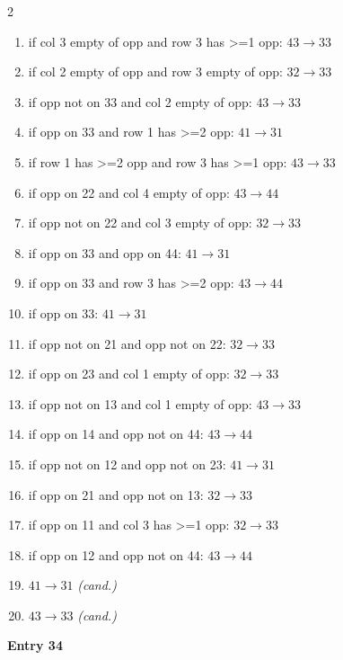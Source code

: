 \begin{multicols}{2}
\begin{tikzpicture}[scale=0.24]
\end{tikzpicture}
\nopagebreak\begin{enumerate}[topsep=1pt,itemsep=0pt,parsep=0pt,leftmargin=2.2em,label=\arabic*.]
\item if col 3 empty of opp and row 3 has >=1 opp: $43\!\to\!33$
\item if col 2 empty of opp and row 3 empty of opp: $32\!\to\!33$
\item if opp not on 33 and col 2 empty of opp: $43\!\to\!33$
\item if opp on 33 and row 1 has >=2 opp: $41\!\to\!31$
\item if row 1 has >=2 opp and row 3 has >=1 opp: $43\!\to\!33$
\item if opp on 22 and col 4 empty of opp: $43\!\to\!44$
\item if opp not on 22 and col 3 empty of opp: $32\!\to\!33$
\item if opp on 33 and opp on 44: $41\!\to\!31$
\item if opp on 33 and row 3 has >=2 opp: $43\!\to\!44$
\item if opp on 33: $41\!\to\!31$
\item if opp not on 21 and opp not on 22: $32\!\to\!33$
\item if opp on 23 and col 1 empty of opp: $32\!\to\!33$
\item if opp not on 13 and col 1 empty of opp: $43\!\to\!33$
\item if opp on 14 and opp not on 44: $43\!\to\!44$
\item if opp not on 12 and opp not on 23: $41\!\to\!31$
\item if opp on 21 and opp not on 13: $32\!\to\!33$
\item if opp on 11 and col 3 has >=1 opp: $32\!\to\!33$
\item if opp on 12 and opp not on 44: $43\!\to\!44$
\item $41\!\to\!31$ \hfill\textit{(cand.)}
\item $43\!\to\!33$ \hfill\textit{(cand.)}
\end{enumerate}\smallskip
\noindent\textbf{Entry 34} \; 
\end{multicols}
